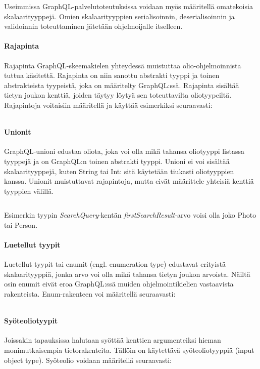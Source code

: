 Useimmissa GraphQL-palvelutoteutuksissa voidaan myös määritellä omatekoisia skalaarityyppejä. Omien skalaarityyppien serialisoinnin, deserialisoinnin ja validoinnin toteuttaminen jätetään ohjelmoijalle itselleen. \cite{SchemasAndTypes}

\paragraph{Rajapinta} Rajapinta GraphQL-skeemakielen yhteydessä muistuttaa olio-ohjelmoinnista tuttua käsitettä. Rajapinta on niin sanottu abstrakti tyyppi ja toinen abstrakteista tyypeistä, joka on määritelty GraphQL:ssä. Rajapinta sisältää tietyn joukon kenttiä, joiden täytyy löytyä sen toteuttavilta oliotyypeiltä. \cite{SchemasAndTypes, graphql-spec} Rajapintoja voitaisiin määritellä ja käyttää esimerkiksi seuraavasti:

\inputminted{gql.py:GraphQLLexer -x}{listaukset/interface.graphql}

\paragraph{Unionit} GraphQL-unioni edustaa oliota, joka voi olla mikä tahansa oliotyyppi listassa tyyppejä ja on GraphQL:n toinen abstrakti tyyppi. Unioni ei voi sisältää skalaarityyppejä, kuten String tai Int: sitä käytetään tiukasti oliotyyppien kanssa. Unionit muistuttavat rajapintoja, mutta eivät määrittele yhteisiä kenttiä tyyppien välillä. \cite{graphql-spec}

\inputminted{gql.py:GraphQLLexer -x}{listaukset/union.graphql}

Esimerkin tyypin \textit{SearchQuery}-kentän \textit{firstSearchResult}-arvo voisi olla joko Photo tai Person.

\paragraph{Luetellut tyypit} Luetellut tyypit tai enumit (engl. enumeration type) edustavat erityistä skalaarityyppiä, jonka arvo voi olla mikä tahansa tietyn joukon arvoista. Näiltä osin enumit eivät eroa GraphQL:ssä muiden ohjelmointikielien vastaavista rakenteista. Enum-rakenteen voi määritellä seuraavasti: \cite{graphql-spec, SchemasAndTypes}

\inputminted{gql.py:GraphQLLexer -x}{listaukset/enum.graphql}

\paragraph{Syöteoliotyypit} Joissakin tapauksissa halutaan syöttää kenttien argumenteiksi hieman monimutkaisempia tietorakenteita. Tällöin on käytettävä syöteoliotyyppiä (input object type). Syöteolio voidaan määritellä seuraavasti:

